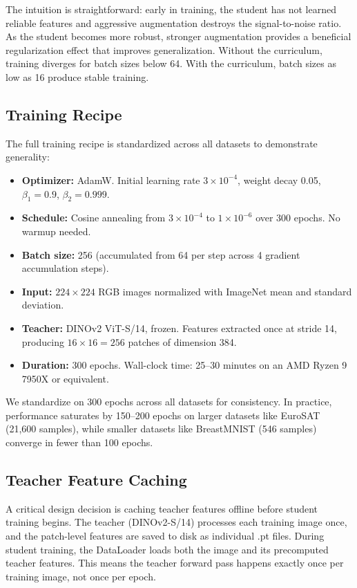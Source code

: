 \documentclass{article}
\begin{document}
The intuition is straightforward: early in training, the student has not learned reliable features and aggressive augmentation destroys the signal-to-noise ratio. As the student becomes more robust, stronger augmentation provides a beneficial regularization effect that improves generalization. Without the curriculum, training diverges for batch sizes below 64. With the curriculum, batch sizes as low as 16 produce stable training.

\subsection{Training Recipe}

The full training recipe is standardized across all datasets to demonstrate generality:

\begin{itemize}
    \item \textbf{Optimizer:} AdamW. Initial learning rate $3 \times 10^{-4}$, weight decay 0.05, $\beta_1=0.9$, $\beta_2=0.999$.
    \item \textbf{Schedule:} Cosine annealing from $3 \times 10^{-4}$ to $1 \times 10^{-6}$ over 300 epochs. No warmup needed.
    \item \textbf{Batch size:} 256 (accumulated from 64 per step across 4 gradient accumulation steps).
    \item \textbf{Input:} $224 \times 224$ RGB images normalized with ImageNet mean and standard deviation.
    \item \textbf{Teacher:} DINOv2 ViT-S/14, frozen. Features extracted once at stride 14, producing $16 \times 16 = 256$ patches of dimension 384.
    \item \textbf{Duration:} 300 epochs. Wall-clock time: 25--30 minutes on an AMD Ryzen 9 7950X or equivalent.
\end{itemize}

We standardize on 300 epochs across all datasets for consistency. In practice, performance saturates by 150--200 epochs on larger datasets like EuroSAT (21,600 samples), while smaller datasets like BreastMNIST (546 samples) converge in fewer than 100 epochs.

\subsection{Teacher Feature Caching}

A critical design decision is caching teacher features offline before student training begins. The teacher (DINOv2-S/14) processes each training image once, and the patch-level features are saved to disk as individual .pt files. During student training, the DataLoader loads both the image and its precomputed teacher features. This means the teacher forward pass happens exactly once per training image, not once per epoch.
\end{document}
